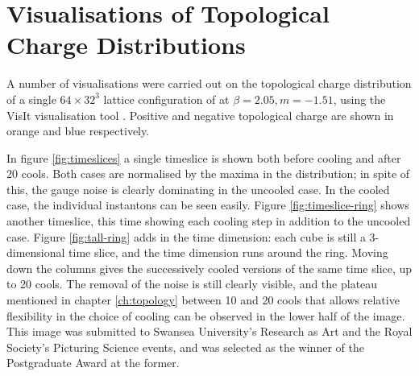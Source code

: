 \chapter{Visualisations of Topological Charge Distributions}
\label{app:vis}

    \graphicspath{{Appendices_Folder/figures/PNG/}{Appendices_Folder/figures/PDF/}{Appendices_Folder/figures/}}

A number of visualisations were carried out on the topological charge distribution of a single $64\times{32}^3$ lattice configuration of \lmwt at $\beta=2.05,m=-1.51$, using the VisIt visualisation tool \cite{Childs:2005:ACS,visit-website}. Positive and negative topological charge are shown in orange and blue respectively.

In figure \ref{fig:timeslices} a single timeslice is shown both before cooling and after 20 cools. Both cases are normalised by the maxima in the distribution; in spite of this, the gauge noise is clearly dominating in the uncooled case. In the cooled case, the individual instantons can be seen easily. Figure \ref{fig:timeslice-ring} shows another timeslice, this time showing each cooling step in addition to the uncooled case. Figure \ref{fig:tall-ring} adds in the time dimension: each cube is still a 3-dimensional time slice, and the time dimension runs around the ring. Moving down the columns gives the successively cooled versions of the same time slice, up to 20 cools. The removal of the noise is still clearly visible, and the plateau mentioned in chapter \ref{ch:topology} between 10 and 20 cools that allows relative flexibility in the choice of cooling can be observed in the lower half of the image. This image was submitted to Swansea University's Research as Art and the Royal Society's Picturing Science events, and was selected as the winner of the Postgraduate Award at the former.

